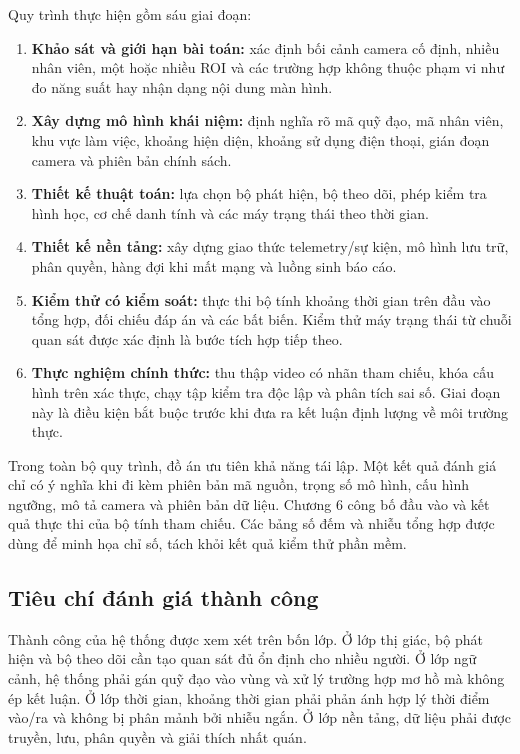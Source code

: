 Quy trình thực hiện gồm sáu giai đoạn:
\begin{enumerate}
\item \textbf{Khảo sát và giới hạn bài toán:} xác định bối cảnh camera cố định, nhiều nhân viên, một hoặc nhiều ROI và các trường hợp không thuộc phạm vi như đo năng suất hay nhận dạng nội dung màn hình.
\item \textbf{Xây dựng mô hình khái niệm:} định nghĩa rõ mã quỹ đạo, mã nhân viên, khu vực làm việc, khoảng hiện diện, khoảng sử dụng điện thoại, gián đoạn camera và phiên bản chính sách.
\item \textbf{Thiết kế thuật toán:} lựa chọn bộ phát hiện, bộ theo dõi, phép kiểm tra hình học, cơ chế danh tính và các máy trạng thái theo thời gian.
\item \textbf{Thiết kế nền tảng:} xây dựng giao thức telemetry/sự kiện, mô hình lưu trữ, phân quyền, hàng đợi khi mất mạng và luồng sinh báo cáo.
\item \textbf{Kiểm thử có kiểm soát:} thực thi bộ tính khoảng thời gian trên đầu vào tổng hợp, đối chiếu đáp án và các bất biến. Kiểm thử máy trạng thái từ chuỗi quan sát được xác định là bước tích hợp tiếp theo.
\item \textbf{Thực nghiệm chính thức:} thu thập video có nhãn tham chiếu, khóa cấu hình trên xác thực, chạy tập kiểm tra độc lập và phân tích sai số. Giai đoạn này là điều kiện bắt buộc trước khi đưa ra kết luận định lượng về môi trường thực.
\end{enumerate}

Trong toàn bộ quy trình, đồ án ưu tiên khả năng tái lập. Một kết quả đánh giá chỉ có ý nghĩa khi đi kèm phiên bản mã nguồn, trọng số mô hình, cấu hình ngưỡng, mô tả camera và phiên bản dữ liệu. Chương 6 công bố đầu vào và kết quả thực thi của bộ tính tham chiếu. Các bảng số đếm và nhiễu tổng hợp được dùng để minh họa chỉ số, tách khỏi kết quả kiểm thử phần mềm.

\subsection{Tiêu chí đánh giá thành công}
Thành công của hệ thống được xem xét trên bốn lớp. Ở lớp thị giác, bộ phát hiện và bộ theo dõi cần tạo quan sát đủ ổn định cho nhiều người. Ở lớp ngữ cảnh, hệ thống phải gán quỹ đạo vào vùng và xử lý trường hợp mơ hồ mà không ép kết luận. Ở lớp thời gian, khoảng thời gian phải phản ánh hợp lý thời điểm vào/ra và không bị phân mảnh bởi nhiễu ngắn. Ở lớp nền tảng, dữ liệu phải được truyền, lưu, phân quyền và giải thích nhất quán.

